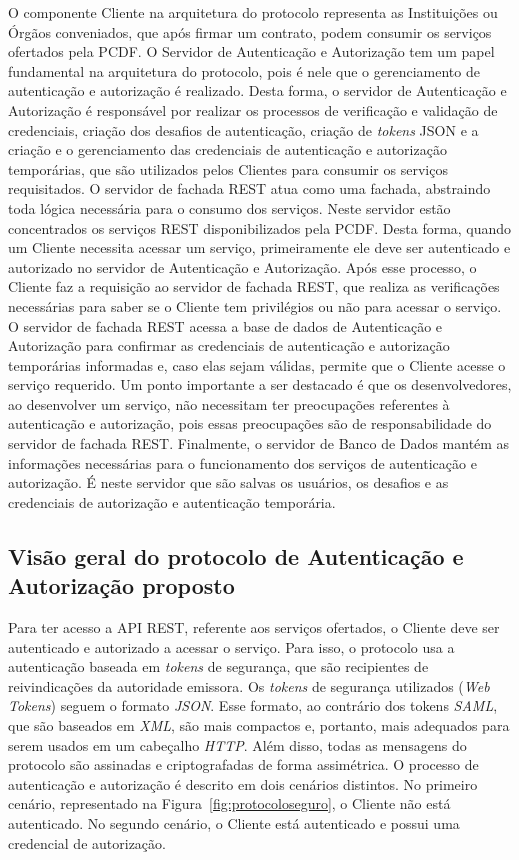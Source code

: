O componente Cliente na arquitetura do protocolo representa as Instituições ou Órgãos conveniados, que após firmar um contrato, podem consumir os serviços ofertados pela PCDF.
O Servidor de Autenticação e Autorização tem um papel fundamental na arquitetura do protocolo, pois é nele que o gerenciamento de autenticação e autorização é realizado. Desta forma, o servidor de Autenticação e Autorização é responsável por realizar os processos de verificação e validação de credenciais, criação dos desafios de autenticação, criação de \emph{tokens} JSON e a criação e o gerenciamento das credenciais de autenticação e autorização temporárias, que são utilizados pelos Clientes para consumir os serviços requisitados.
O servidor de fachada REST atua como uma fachada, abstraindo toda lógica necessária para o consumo dos serviços. Neste servidor estão concentrados os serviços REST disponibilizados pela PCDF. Desta forma, quando um Cliente necessita acessar um serviço, primeiramente ele deve ser autenticado e autorizado no servidor de Autenticação e Autorização. Após esse processo, o Cliente faz a requisição ao servidor de fachada REST, que realiza as verificações necessárias para saber se o Cliente tem privilégios ou não para acessar o serviço. O servidor de fachada REST acessa a base de dados de Autenticação e Autorização para confirmar as credenciais de autenticação e autorização temporárias informadas e, caso elas sejam válidas, permite que o Cliente acesse o serviço requerido. Um ponto importante a ser destacado é que os desenvolvedores, ao desenvolver um serviço, não necessitam ter preocupações referentes à autenticação e autorização, pois essas preocupações são de responsabilidade do servidor de fachada REST. Finalmente, o servidor de Banco de Dados mantém as informações necessárias para o funcionamento dos serviços de autenticação e autorização. É neste servidor que são salvas os usuários, os desafios e as credenciais de autorização e autenticação temporária.


\subsection{Visão geral do protocolo de Autenticação e Autorização proposto}

Para ter acesso a API REST, referente aos serviços ofertados, o Cliente deve ser autenticado e autorizado a acessar o serviço. Para isso, o protocolo usa a autenticação baseada em \emph{tokens} de segurança, que são recipientes de reivindicações da autoridade emissora. Os \emph{tokens} de segurança utilizados (\emph{Web Tokens}) seguem o formato \emph{JSON}. Esse formato, ao contrário dos tokens \emph{SAML}, que são baseados em \emph{XML}, são mais compactos e, portanto, mais adequados para serem usados em um cabeçalho \emph{HTTP}. Além disso, todas as mensagens do protocolo são assinadas e criptografadas de forma assimétrica. O processo de autenticação e autorização é descrito em dois cenários distintos. No primeiro cenário, representado na Figura~\ref{fig:protocoloseguro}, o Cliente não está autenticado. No segundo cenário, o Cliente está autenticado e possui uma credencial de autorização. %

